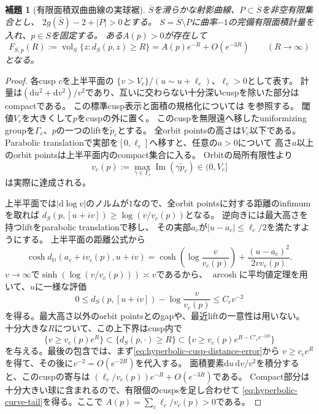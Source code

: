 \documentclass[11pt,a4paper]{ltjsarticle}
\newcommand{\dd}{\mathrm d}
\newcommand{\vol}{\operatorname{vol}}
\newcommand{\ov}{\overline}
\theoremstyle{plain}
\newtheorem{lemma}[lemma]{補題}
\theoremstyle{definition}
\theoremstyle{remark}
\begin{document}
\begin{lemma}[有限面積双曲曲線の実球裾]
\label{lem:hyperbolic-curve-tail}
$\ov S$を滑らかな射影曲線、$P\subset\ov S$を非空有限集合とし、
$2g(\ov S)-2+|P|>0$とする。
$S=\ov S\setminus P$に曲率$-1$の完備有限面積計量を入れ、$p\in S$を固定する。
ある$A(p)>0$が存在して
\begin{equation}
\label{eq:hyperbolic-curve-tail}
 F_{S,p}(R):=\vol_S\{z:d_S(p,z)\ge R\}
 =A(p)e^{-R}+O(e^{-3R})
 \qquad(R\to\infty)
\end{equation}
となる。
\end{lemma}
\begin{proof}
各cusp $c$を上半平面の
$\{v>V_c\}/(u\sim u+\ell_c)$、$\ell_c>0$として表す。
計量は$(\dd u^2+\dd v^2)/v^2$であり、互いに交わらない十分深いcuspを除いた部分はcompactである。
この標準cusp表示と面積の規格化については
\cite[\S1.1, p.~68; \S2.1]{HaasCusp}を参照する。
閾値$V_c$を大きくして$p$をcuspの外に置く。
このcuspを無限遠へ移したuniformizing groupを$\Gamma_c$、$p$の一つのliftを$\widetilde p_c$とする。
全orbit pointsの高さは$V_c$以下である。
Parabolic translationで実部を$[0,\ell_c]$へ移すと、任意の$a>0$について
高さ$a$以上のorbit pointsは上半平面内のcompact集合に入る。
Orbitの局所有限性より
\[
 v_c(p):=\max_{\gamma\in\Gamma_c}
               \operatorname{Im}(\gamma\widetilde p_c)
 \in(0,V_c]
\]
は実際に達成される。

上半平面では$|\dd\log v|$のノルムが$1$なので、全orbit pointsに対する距離のinfimumを取れば
$d_S(p,[u+iv])\ge\log(v/v_c(p))$となる。
逆向きには最大高さを持つliftをparabolic translationで移し、
その実部$a_c$が$|u-a_c|\le\ell_c/2$を満たすようにする。
上半平面の距離公式から
\[
 \cosh d_{\mathbb H}(a_c+iv_c(p),u+iv)
 =\cosh\!\left(\log\frac{v}{v_c(p)}\right)
   +\frac{(u-a_c)^2}{2v v_c(p)}.
\]
$v\to\infty$で$\sinh(\log(v/v_c(p)))\asymp v$であるから、
$\operatorname{arcosh}$に平均値定理を用いて、$u$に一様な評価
\begin{equation}
\label{eq:hyperbolic-cusp-distance-error}
 0\le d_S(p,[u+iv])-\log\frac{v}{v_c(p)}\le C_cv^{-2}
\end{equation}
を得る。最大高さ以外のorbit pointsとのgapや、最近liftの一意性は用いない。
十分大きな$R$について、この上下界はcusp内で
\[
 \{v\ge v_c(p)e^R\}
 \subset\{d_S(p,\cdot)\ge R\}
 \subset\{v\ge v_c(p)e^{R-C'_ce^{-2R}}\}
\]
を与える。最後の包含では、まず\eqref{eq:hyperbolic-cusp-distance-error}から
$v\ge c_ce^R$を得て、その後に$v^{-2}=O(e^{-2R})$を代入する。
面積要素$\dd u\,\dd v/v^2$を積分すると、このcuspの寄与は
$(\ell_c/v_c(p))e^{-R}+O(e^{-3R})$である。
Compact部分は十分大きい球に含まれるので、有限個のcuspsを足し合わせて
\eqref{eq:hyperbolic-curve-tail}を得る。ここで
$A(p)=\sum_c\ell_c/v_c(p)>0$である。
\end{proof}
\end{document}
